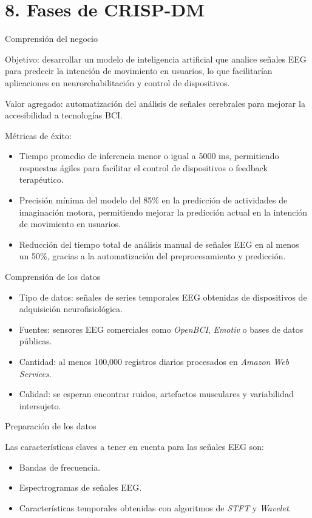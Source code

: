 \documentclass[
11pt, %
]{charter}
\begin{document}
\section{8. Fases de CRISP-DM}
\label{sec:entregables}

Comprensión del negocio

Objetivo: desarrollar un modelo de inteligencia artificial que analice señales EEG para predecir la intención de movimiento en usuarios, lo que facilitarían aplicaciones en neurorehabilitación y control de dispositivos.

Valor agregado: automatización del análisis de señales cerebrales para mejorar la accesibilidad a tecnologías BCI.

Métricas de éxito: 
\begin{itemize}
    \item Tiempo promedio de inferencia menor  o igual a 5000 ms, permitiendo respuestas ágiles para facilitar el control de dispositivos o feedback terapéutico.
    \item Precisión mínima del modelo del 85\% en la predicción de actividades de imaginación motora, permitiendo mejorar la predicción  actual en la intención de movimiento en usuarios.
    \item Reducción del tiempo total de análisis manual de señales EEG en al menos un 50\%, gracias a la automatización del preprocesamiento y predicción.
\end{itemize}

Comprensión de los datos

\begin{itemize}
	\item Tipo de datos: señales de series temporales EEG obtenidas de dispositivos de adquisición neurofisiológica.
	\item Fuentes: sensores EEG comerciales como \textit{OpenBCI}, \textit{Emotiv} o bases de datos públicas.
	\item Cantidad: al menos 100,000 registros diarios procesados en \textit{Amazon Web Services}.
	\item Calidad: se esperan encontrar ruidos, artefactos musculares y variabilidad intersujeto.
\end{itemize}

Preparación de los datos

Las características claves a tener en cuenta para las señales EEG son:

\begin{itemize}
	\item Bandas de frecuencia.
	\item Espectrogramas de señales EEG.
	\item Características temporales obtenidas con algoritmos de \textit{STFT} y \textit{Wavelet}.
\end{itemize}
\end{document}
